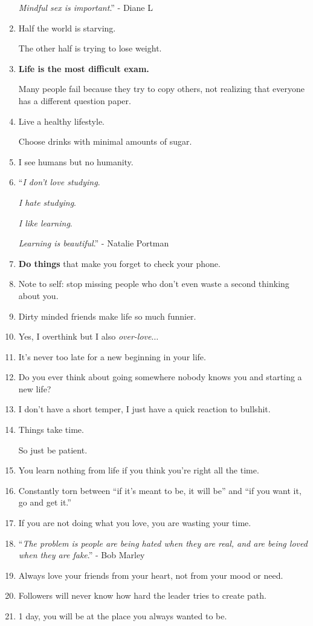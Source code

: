 \documentclass{article}
\begin{document}
\begin{enumerate}
	\textit{Mindful sex is important}.'' - Diane L
	\item Half the world is starving.
	
	The other half is trying to lose weight.
	\item \textbf{Life is the most difficult exam.}
	
	Many people fail because they try to copy others, not realizing that everyone has a different question paper.
	\item Live a healthy lifestyle.
	
	Choose drinks with minimal amounts of sugar.
	\item I see humans but no humanity.
	\item ``\textit{I don't love studying}.
	
	\textit{I hate studying}.
	
	\textit{I like learning}.
	
	\textit{Learning is beautiful}.'' - Natalie Portman
	\item \textbf{Do things} that make you forget to check your phone.
	\item Note to self: stop missing people who don't even waste a second thinking about you.
	\item Dirty minded friends make life so much funnier.
	\item Yes, I overthink but I also \textit{over-love}$\ldots$
	\item It's never too late for a new beginning in your life.
	\item Do you ever think about going somewhere nobody knows you and starting a new life?
	\item I don't have a short temper, I just have a quick reaction to bullshit.
	\item Things take time.
	
	So just be patient.
	\item You learn nothing from life if you think you're right all the time.
	\item Constantly torn between ``if it's meant to be, it will be'' and ``if you want it, go and get it.''
	\item If you are not doing what you love, you are wasting your time.
	\item ``\textit{The problem is people are being hated when they are real, and are being loved when they are fake}.'' - Bob Marley
	\item Always love your friends from your heart, not from your mood or need.
	\item Followers will never know how hard the leader tries to create path.
	\item 1 day, you will be at the place you always wanted to be.
	

\end{enumerate}
\end{document}
